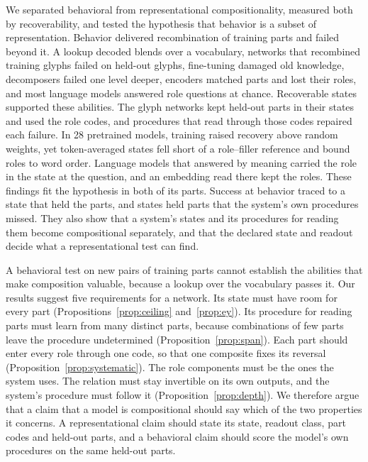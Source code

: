 \documentclass[10pt]{article}
\theoremstyle{plain}
\theoremstyle{remark}
\begin{document}
We separated behavioral from representational compositionality, measured both by recoverability, and tested the hypothesis that behavior is a subset of representation. Behavior delivered recombination of training parts and failed beyond it. A lookup decoded blends over a vocabulary, networks that recombined training glyphs failed on held-out glyphs, fine-tuning damaged old knowledge, decomposers failed one level deeper, encoders matched parts and lost their roles, and most language models answered role questions at chance. Recoverable states supported these abilities. The glyph networks kept held-out parts in their states and used the role codes, and procedures that read through those codes repaired each failure. In 28 pretrained models, training raised recovery above random weights, yet token-averaged states fell short of a role--filler reference and bound roles to word order. Language models that answered by meaning carried the role in the state at the question, and an embedding read there kept the roles. These findings fit the hypothesis in both of its parts. Success at behavior traced to a state that held the parts, and states held parts that the system's own procedures missed. They also show that a system's states and its procedures for reading them become compositional separately, and that the declared state and readout decide what a representational test can find.

A behavioral test on new pairs of training parts cannot establish the abilities that make composition valuable, because a lookup over the vocabulary passes it. Our results suggest five requirements for a network. Its state must have room for every part (Propositions~\ref{prop:ceiling} and~\ref{prop:ey}). Its procedure for reading parts must learn from many distinct parts, because combinations of few parts leave the procedure undetermined (Proposition~\ref{prop:span}). Each part should enter every role through one code, so that one composite fixes its reversal (Proposition~\ref{prop:systematic}). The role components must be the ones the system uses. The relation must stay invertible on its own outputs, and the system's procedure must follow it (Proposition~\ref{prop:depth}). We therefore argue that a claim that a model is compositional should say which of the two properties it concerns. A representational claim should state its state, readout class, part codes and held-out parts, and a behavioral claim should score the model's own procedures on the same held-out parts.
\end{document}
